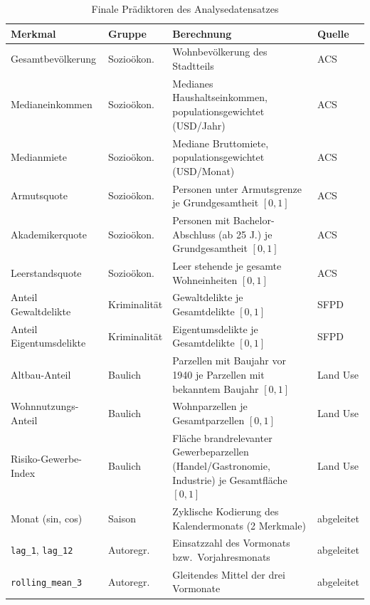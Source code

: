 \begin{table}[htbp]
  \centering
  \caption{Finale Prädiktoren des Analysedatensatzes}
  \label{tab:praediktoren}
  {\small
  \begin{tabular}{llp{5.6cm}l}
    \hline
    \textbf{Merkmal} & \textbf{Gruppe} & \textbf{Berechnung} &
    \textbf{Quelle} \\
    \hline
    Gesamtbevölkerung & Sozioökon. & Wohnbevölkerung des Stadtteils &
      ACS \\
    Medianeinkommen & Sozioökon. & Medianes Haushaltseinkommen,
      populationsgewichtet (USD/Jahr) & ACS \\
    Medianmiete & Sozioökon. & Mediane Bruttomiete,
      populationsgewichtet (USD/Monat) & ACS \\
    Armutsquote & Sozioökon. & Personen unter Armutsgrenze je
      Grundgesamtheit $[0,1]$ & ACS \\
    Akademikerquote & Sozioökon. & Personen mit Bachelor-Abschluss (ab 25
      J.) je Grundgesamtheit $[0,1]$ & ACS \\
    Leerstandsquote & Sozioökon. & Leer stehende je gesamte Wohneinheiten
      $[0,1]$ & ACS \\
    Anteil Gewaltdelikte & Kriminalität & Gewaltdelikte je Gesamtdelikte
      $[0,1]$ & SFPD \\
    Anteil Eigentumsdelikte & Kriminalität & Eigentumsdelikte je
      Gesamtdelikte $[0,1]$ & SFPD \\
    Altbau-Anteil & Baulich & Parzellen mit Baujahr vor 1940 je Parzellen
      mit bekanntem Baujahr $[0,1]$ & Land Use \\
    Wohnnutzungs-Anteil & Baulich & Wohnparzellen je Gesamtparzellen
      $[0,1]$ & Land Use \\
    Risiko-Gewerbe-Index & Baulich & Fläche brandrelevanter
      Gewerbeparzellen (Handel/Gastronomie, Industrie) je Gesamtfläche
      $[0,1]$ & Land Use \\
    Monat (sin, cos) & Saison & Zyklische Kodierung des Kalendermonats
      (2 Merkmale) & abgeleitet \\
    \texttt{lag\_1}, \texttt{lag\_12} & Autoregr. & Einsatzzahl des Vormonats
      bzw.\ Vorjahresmonats & abgeleitet \\
    \texttt{rolling\_mean\_3} & Autoregr. & Gleitendes Mittel der drei
      Vormonate & abgeleitet \\
    \hline
  \end{tabular}}
\end{table}

